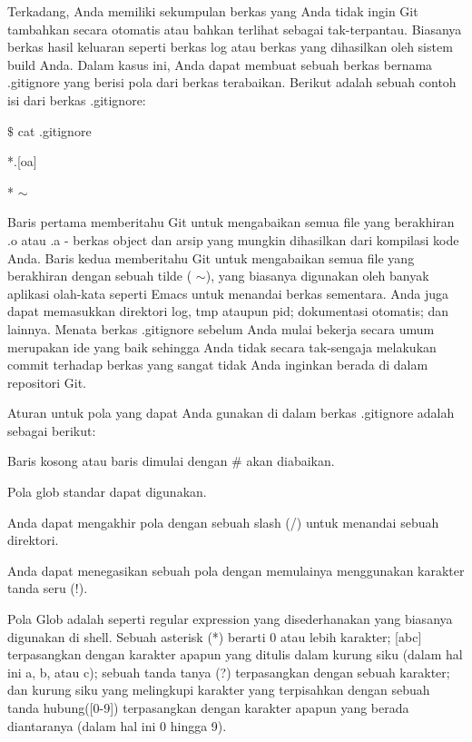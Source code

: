 \par
\noindent 
Terkadang, Anda memiliki sekumpulan berkas yang Anda tidak ingin Git tambahkan secara otomatis atau bahkan terlihat sebagai tak-terpantau. Biasanya berkas hasil keluaran seperti berkas log atau berkas yang dihasilkan oleh sistem build Anda. Dalam kasus ini, Anda dapat membuat sebuah berkas bernama .gitignore yang berisi pola dari berkas terabaikan. Berikut adalah sebuah contoh isi dari berkas .gitignore: \par
\noindent 
 $  \$  $ cat .gitignore \par
\noindent 
*.[oa] \par
\noindent 
* $  \sim  $ \par
\noindent 
Baris pertama memberitahu Git untuk mengabaikan semua file yang berakhiran .o atau .a - berkas object dan arsip yang mungkin dihasilkan dari kompilasi kode Anda. Baris kedua memberitahu Git untuk mengabaikan semua file yang berakhiran dengan sebuah tilde ( $  \sim  $), yang biasanya digunakan oleh banyak aplikasi olah-kata seperti Emacs untuk menandai berkas sementara. Anda juga dapat memasukkan direktori log, tmp ataupun pid; dokumentasi otomatis; dan lainnya. Menata berkas .gitignore sebelum Anda mulai bekerja secara umum merupakan ide yang baik sehingga Anda tidak secara tak-sengaja melakukan commit terhadap berkas yang sangat tidak Anda inginkan berada di dalam repositori Git. \par
\noindent 
Aturan untuk pola yang dapat Anda gunakan di dalam berkas .gitignore adalah sebagai berikut: \par
\noindent 
Baris kosong atau baris dimulai dengan  $  \#  $ akan diabaikan. \par
\noindent 
Pola glob standar dapat digunakan. \par
\noindent 
Anda dapat mengakhir pola dengan sebuah slash (/) untuk menandai sebuah direktori. \par
\noindent 
Anda dapat menegasikan sebuah pola dengan memulainya menggunakan karakter tanda seru (!). \par
\noindent 
Pola Glob adalah seperti regular expression yang disederhanakan yang biasanya digunakan di shell. Sebuah asterisk (*) berarti 0 atau lebih karakter; $  $[abc] $  $terpasangkan dengan karakter apapun yang ditulis dalam kurung siku (dalam hal ini a, b, atau c); sebuah tanda tanya (?) terpasangkan dengan sebuah karakter; dan kurung siku yang melingkupi karakter yang terpisahkan dengan sebuah tanda hubung([0-9]) terpasangkan dengan karakter apapun yang berada diantaranya (dalam hal ini 0 hingga 9). \par
